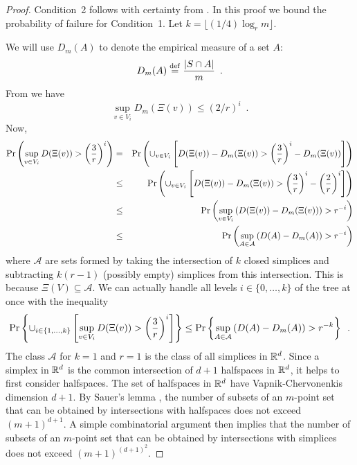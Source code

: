 \documentclass{patmorin}
\begin{document}
\begin{proof}
Condition~2 follows with certainty from .  In this
proof we bound the probability of failure for Condition~1.  Let $k=\lfloor (1/4)\log_rm\rfloor$.

We will use $D_m(A)$ to denote the empirical measure of a set $A$: 
\[ 
  D_m (A) \isdef {{|S\cap A|} \over m} \enspace .
\]  
From  we have
\[
  \sup_{v\in V_i} D_m(\Xi(v)) \le (2/r)^i \enspace .
\]
Now,
\begin{eqnarray*}
\Pr \left( \sup_{v\in V_i} D ( \Xi(v) ) > \left(\frac{3}{r}\right)^i \right)
&=& \Pr \left( \cup_{v\in V_i} \left[ D ( \Xi(v) ) - D_m(\Xi(v))  >  \left(\frac{3}{r}\right)^i - D_m(\Xi(v)) \right] \right) \cr
&\le& \Pr \left( \cup_{v\in V_i} \left[ D ( \Xi(v) ) - D_m(\Xi(v))  > \left(\frac{3}{r}\right)^i - \left(\frac{2}{r}\right)^i  \right] \right) \cr
&\le& \Pr \left( \sup_{v\in V_i} \left(  D ( \Xi(v) ) - D_m(\Xi(v)) \right) > r^{-i} \right) \cr
&\le& \Pr \left( \sup_{A \in {\mathcal{A}}} \left( D ( A ) - D_m ( A ) \right)  > r^{-i} \right) \cr
\end{eqnarray*}
where $\mathcal{A}$ are sets formed by taking the intersection of $k$
closed simplices and subtracting $k(r-1)$  (possibly empty) simplices
from this intersection.  This is because $\Xi(V)\subseteq \mathcal{A}$.
We can actually handle all levels $i\in \{0,\ldots,k\}$ of the tree at
once with the inequality
\begin{eqnarray*}
\Pr \left\{ \cup_{i\in\{1,\ldots,k\}}\left[\sup_{v\in V_i} D ( \Xi(v) ) > \left(\frac{3}{r}\right)^i \right] \right\}
\leq \Pr \left\{ \sup_{A \in {\mathcal{A}}} \left( D ( A ) - D_m ( A ) \right)  > r^{-k} \right\} \enspace .
\end{eqnarray*}
The class $\mathcal{A}$ for $k=1$ and $r=1$ is the class of all simplices
in $\mathbb{R}^d$.   Since a simplex in $\mathbb{R}^d$ is the common intersection of $d+1$
halfspaces in $\mathbb{R}^d$, it helps to first consider halfspaces.  The set of
halfspaces in $\mathbb{R}^d$ have Vapnik-Chervonenkis dimension $d+1$.  By Sauer's
lemma \cite{s72}\cite[pages~28--29]{dl01}, the number of subsets of an
$m$-point set that can be obtained by intersections with halfspaces does
not exceed $(m+1)^{d+1}$.  A simple combinatorial argument then implies
that the number of subsets of an $m$-point set that can be obtained by
intersections with simplices does not exceed $(m+1)^{(d+1)^2}$.


\end{proof}
\end{document}
